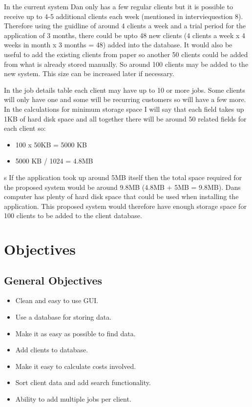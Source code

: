 \begin{flushleft}

	In the current system Dan only has a few regular clients but it is possible to receive up to 4-5 additional clients each week (mentioned in interviequestion 8). Therefore using the guidline of around 4 clients a week and a trial period for the application of 3 months, there could be upto 48 new clients (4 clients a week x 4 weeks in month x 3 months = 48) added into the database. It would also be useful to add the existing clients from paper so another 50 clients could be added from what is already stored manually. So around 100 clients may be added to the new system. This size can be increased later if necessary. \par

In the job details table each client may have up to 10 or more jobs. Some clients will only have one and some will be recurring customers so will have a few more. In the calculations for minimum storage space I will say that each field takes up 1KB of hard disk space and all together there will be around 50 related fields for each client so:

\begin{itemize}
    \item 100 x 50KB = 5000 KB
	 \item 5000 KB / 1024 = 4.8MB
\end{itemize}
s
If the application took up around 5MB itself then the total space required for the proposed system would be around 9.8MB (4.8MB + 5MB = 9.8MB). Dans computer has plenty of hard disk space that could be used when installing the application. This proposed system would therefore have enough storage space for 100 clients to be added to the client database.


\end{flushleft}



\section{Objectives}

\subsection{General Objectives}

	\begin{itemize}
		\item Clean and easy to use GUI.
		\item Use a database for storing data.
		\item Make it as easy as possible to find data.
		\item Add clients to database.
		\item Make it easy to calculate costs involved.
		\item Sort client data and add search functionality.
		\item Ability to add multiple jobs per client.
	\end{itemize}

